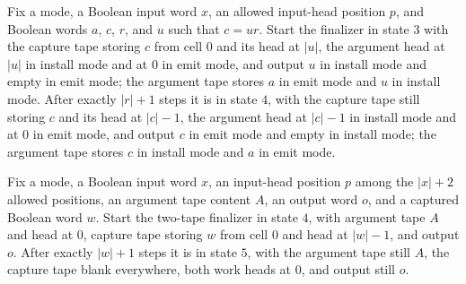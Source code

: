\begin{lemma}
\label{Turing.FinTM.emCall_finish_transfer}
\leanok
{}
Fix a mode, a Boolean input word $x$, an allowed input-head position $p$, and Boolean
words $a$, $c$, $r$, and $u$ such that $c=ur$. Start the finalizer in state $3$ with the
capture tape storing $c$ from cell $0$ and its head at $|u|$, the argument head at $|u|$
in install mode and at $0$ in emit mode, and output $u$ in install mode and empty in
emit mode; the argument tape stores $a$ in emit mode and $u$ in install mode. After
exactly $|r|+1$ steps it is in state $4$, with the capture tape still storing $c$ and
its head at $|c|-1$, the argument head at $|c|-1$ in install mode and at $0$ in emit
mode, and output $c$ in emit mode and empty in install mode; the argument tape stores
$c$ in install mode and $a$ in emit mode.
\end{lemma}

\begin{lemma}
\label{Turing.FinTM.emCall_finish_erase}
\leanok
{}
Fix a mode, a Boolean input word $x$, an input-head position $p$ among the $|x|+2$
allowed positions, an argument tape content $A$, an output word $o$, and a captured
Boolean word $w$. Start the two-tape finalizer in state $4$, with argument tape $A$ and
head at $0$, capture tape storing $w$ from cell $0$ and head at $|w|-1$, and output $o$.
After exactly $|w|+1$ steps it is in state $5$, with the argument tape still $A$, the
capture tape blank everywhere, both work heads at $0$, and output still $o$.
\end{lemma}

